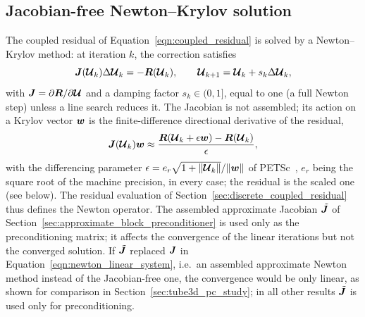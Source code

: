 \subsection{Jacobian-free Newton--Krylov solution}
\label{sec:jfnk_solution}

The coupled residual of Equation~\eqref{eqn:coupled_residual} is solved by a Newton--Krylov method: at iteration $k$, the correction satisfies
\begin{equation}
    \boldsymbol{J}(\boldsymbol{\mathcal{U}}_k)
    \Delta \boldsymbol{\mathcal{U}}_k
    =
    -
    \boldsymbol{R}(\boldsymbol{\mathcal{U}}_k),
    \qquad
    \boldsymbol{\mathcal{U}}_{k+1}
    =
    \boldsymbol{\mathcal{U}}_k
    +
    s_k \Delta \boldsymbol{\mathcal{U}}_k ,
    \label{eqn:newton_linear_system}
\end{equation}
with $\boldsymbol{J} = \partial\boldsymbol{R}/\partial\boldsymbol{\mathcal{U}}$ and a damping factor $s_k \in (0,1]$, equal to one (a full Newton step) unless a line search reduces it.
The Jacobian is not assembled; its action on a Krylov vector $\boldsymbol{w}$ is the finite-difference directional derivative of the residual,
\begin{equation}
    \boldsymbol{J}(\boldsymbol{\mathcal{U}}_k) \boldsymbol{w}
    \approx
    \frac{
    \boldsymbol{R}(\boldsymbol{\mathcal{U}}_k + \epsilon \boldsymbol{w})
    -
    \boldsymbol{R}(\boldsymbol{\mathcal{U}}_k)
    }
    {\epsilon},
    \label{eqn:jfnk_operator}
\end{equation}
with the differencing parameter $\epsilon = e_r\sqrt{1+\|\boldsymbol{\mathcal{U}}_k\|}/\|\boldsymbol{w}\|$ of PETSc~\citep{PETSc}, $e_r$ being the square root of the machine precision, in every case; the residual is the scaled one (see below).
The residual evaluation of Section~\ref{sec:discrete_coupled_residual} thus defines the Newton operator.
The assembled approximate Jacobian $\tilde{\boldsymbol{J}}$ of Section~\ref{sec:approximate_block_preconditioner} is used only as the preconditioning matrix; it affects the convergence of the linear iterations but not the converged solution.
If $\tilde{\boldsymbol{J}}$ replaced $\boldsymbol{J}$ in Equation~\eqref{eqn:newton_linear_system}, i.e.\ an assembled approximate Newton method instead of the Jacobian-free one, the convergence would be only linear, as shown for comparison in Section~\ref{sec:tube3d_pc_study}; in all other results $\tilde{\boldsymbol{J}}$ is used only for preconditioning.

